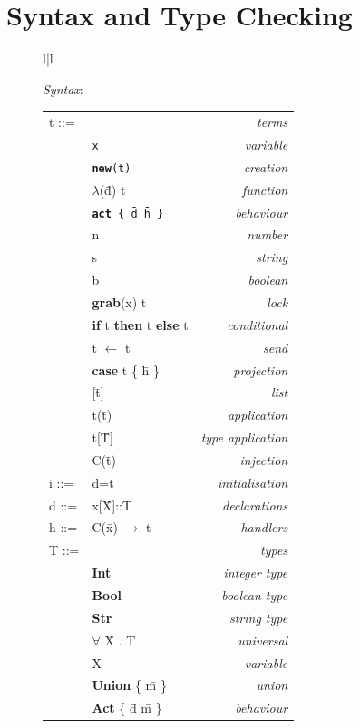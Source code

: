 \documentclass[5p,times]{elsarticle}
\begin{document}
\section{Syntax and Type Checking}

\label{sec:syntax}

\begin{figure}
\begin{tabular}{l|l}
\hline
\begin{minipage}{.275\textwidth}
\footnotesize
{\it Syntax}:\\
\begin{tabular}{llr}
t ::= & & {\it terms}\\
& {\tt x} & {\it variable}\\
& {\tt {\bf new}(t)}& {\it creation}\\
& $\lambda$(\={d}) t&{\it function}\\
& {\tt {\bf act} \{ \={d} \={h} \}}&{\it behaviour}\\
& n & {\it number}\\
& s & {\it string} \\
& b & {\it boolean}\\
& {\bf grab}(x) t & {\it lock}\\
& {\bf if} t {\bf then} t {\bf else} t& {\it conditional}\\
& t $\leftarrow$ t&{\it send}\\
& {\bf case} t \{ \={h} \}&{\it projection}\\
& [\={t}]&{\it list}\\
& t(\={t}) & {\it application}\\
& t[\={T}]& {\it type application}\\
& C(\={t}) & {\it injection}\\
i ::= & d=t& {\it initialisation}\\
d ::= & x[\={X}]::T& {\it declarations}\\
h ::= & C(\={x}) $\rightarrow$ t&{\it handlers}\\
T ::= & & {\it types}\\
& {\bf Int} & {\it integer type}\\
& {\bf Bool} & {\it boolean type}\\
& {\bf Str} & {\it string type}\\
& $\forall$ \={X} . T & {\it universal}\\
& X & {\it variable}\\
& {\bf Union} \{ \={m} \}&{\it union}\\
& {\bf Act} \{ \={d} \={m} \} & {\it behaviour}\\

\end{tabular}
\end{minipage}
\end{tabular}
\end{figure}
\end{document}
